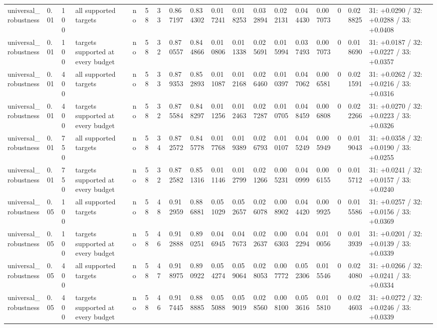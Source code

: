 \begin{tabular}{llllllllllllllllll}
universal\_robustness & 0.01 & 100 & all supported targets & no & 58 & 33 & 0.867197 & 0.834302 & 0.017241 & 0.018253 & 0.032894 & 0.022131 & 0.044430 & 0.007073 & 0 & 0.028825 & 31: +0.0290 / 32: +0.0288 / 33: +0.0408 \\
universal\_robustness & 0.01 & 100 & targets supported at every budget & no & 58 & 32 & 0.870557 & 0.844866 & 0.010806 & 0.011338 & 0.025691 & 0.015994 & 0.037493 & 0.007073 & 0 & 0.018690 & 31: +0.0187 / 32: +0.0227 / 33: +0.0357 \\
universal\_robustness & 0.01 & 400 & all supported targets & no & 58 & 33 & 0.879353 & 0.852893 & 0.011087 & 0.012168 & 0.026460 & 0.010397 & 0.047062 & 0.006581 & 0 & 0.021591 & 31: +0.0262 / 32: +0.0216 / 33: +0.0316 \\
universal\_robustness & 0.01 & 400 & targets supported at every budget & no & 58 & 32 & 0.875584 & 0.848297 & 0.011256 & 0.012463 & 0.027287 & 0.010705 & 0.048459 & 0.006808 & 0 & 0.022266 & 31: +0.0270 / 32: +0.0223 / 33: +0.0326 \\
universal\_robustness & 0.01 & 750 & all supported targets & no & 58 & 34 & 0.872572 & 0.845778 & 0.017768 & 0.019389 & 0.026793 & 0.010107 & 0.045249 & 0.005949 & 0 & 0.019043 & 31: +0.0358 / 32: +0.0190 / 33: +0.0255 \\
universal\_robustness & 0.01 & 750 & targets supported at every budget & no & 58 & 32 & 0.872582 & 0.851316 & 0.011146 & 0.012799 & 0.021266 & 0.005231 & 0.040999 & 0.006155 & 0 & 0.015712 & 31: +0.0241 / 32: +0.0157 / 33: +0.0240 \\
universal\_robustness & 0.05 & 100 & all supported targets & no & 58 & 48 & 0.912959 & 0.886881 & 0.051029 & 0.052657 & 0.026078 & 0.008902 & 0.044420 & 0.009925 & 0 & 0.015586 & 31: +0.0257 / 32: +0.0156 / 33: +0.0369 \\
universal\_robustness & 0.05 & 100 & targets supported at every budget & no & 58 & 46 & 0.912888 & 0.890251 & 0.046945 & 0.047673 & 0.022637 & 0.006303 & 0.042294 & 0.010056 & 0 & 0.013939 & 31: +0.0201 / 32: +0.0139 / 33: +0.0339 \\
universal\_robustness & 0.05 & 400 & all supported targets & no & 58 & 47 & 0.918975 & 0.890922 & 0.054274 & 0.059064 & 0.028053 & 0.007772 & 0.052306 & 0.015546 & 0 & 0.024080 & 31: +0.0266 / 32: +0.0241 / 33: +0.0334 \\
universal\_robustness & 0.05 & 400 & targets supported at every budget & no & 58 & 46 & 0.917445 & 0.888885 & 0.055088 & 0.059019 & 0.028560 & 0.008100 & 0.053616 & 0.015810 & 0 & 0.024603 & 31: +0.0272 / 32: +0.0246 / 33: +0.0339 \\

\end{tabular}
